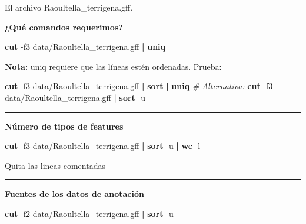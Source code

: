 \documentclass[
]{book}
\newenvironment{Shaded}{\begin{snugshade}}{\end{snugshade}}
\newcommand{\AttributeTok}[1]{\textcolor[rgb]{0.13,0.29,0.53}{#1}}
\newcommand{\CommentTok}[1]{\textcolor[rgb]{0.56,0.35,0.01}{\textit{#1}}}
\newcommand{\FunctionTok}[1]{\textcolor[rgb]{0.13,0.29,0.53}{\textbf{#1}}}
\newcommand{\KeywordTok}[1]{\textcolor[rgb]{0.13,0.29,0.53}{\textbf{#1}}}
\newcommand{\NormalTok}[1]{#1}
\begin{document}
El archivo Raoultella\_terrigena.gff.

\textbf{¿Qué comandos requerimos?}

\begin{Shaded}
\begin{Highlighting}[]
\FunctionTok{cut} \AttributeTok{{-}f3}\NormalTok{ data/Raoultella\_terrigena.gff }\KeywordTok{|} \FunctionTok{uniq}
\end{Highlighting}
\end{Shaded}

\textbf{Nota:} uniq requiere que las líneas estén ordenadas. Prueba:

\begin{Shaded}
\begin{Highlighting}[]
\FunctionTok{cut} \AttributeTok{{-}f3}\NormalTok{ data/Raoultella\_terrigena.gff }\KeywordTok{|} \FunctionTok{sort} \KeywordTok{|} \FunctionTok{uniq}
\CommentTok{\# Alternativa:}
\FunctionTok{cut} \AttributeTok{{-}f3}\NormalTok{ data/Raoultella\_terrigena.gff }\KeywordTok{|} \FunctionTok{sort} \AttributeTok{{-}u}
\end{Highlighting}
\end{Shaded}

\begin{center}\rule{0.5\linewidth}{0.5pt}\end{center}

\textbf{Número de tipos de features}

\begin{Shaded}
\begin{Highlighting}[]
\FunctionTok{cut} \AttributeTok{{-}f3}\NormalTok{ data/Raoultella\_terrigena.gff }\KeywordTok{|} \FunctionTok{sort} \AttributeTok{{-}u} \KeywordTok{|} \FunctionTok{wc} \AttributeTok{{-}l}
\end{Highlighting}
\end{Shaded}

Quita las lineas comentadas

\begin{center}\rule{0.5\linewidth}{0.5pt}\end{center}

\textbf{Fuentes de los datos de anotación}

\begin{Shaded}
\begin{Highlighting}[]
\FunctionTok{cut} \AttributeTok{{-}f2}\NormalTok{ data/Raoultella\_terrigena.gff }\KeywordTok{|} \FunctionTok{sort} \AttributeTok{{-}u}
\end{Highlighting}
\end{Shaded}
\end{document}
